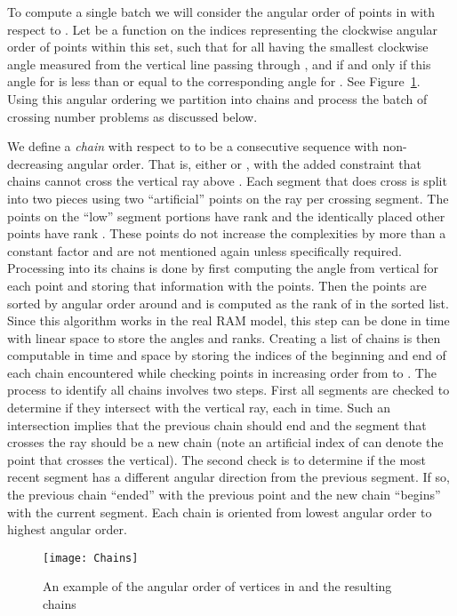 \documentclass{article}
\begin{document}
To compute a single batch we will consider the angular order of points in
 with respect to .  Let
 be a function on the indices representing the clockwise angular
order of points  within this set, such that  for 
all  having the smallest clockwise angle measured from the vertical
line passing through , and  if and only if this
angle for  is less than or equal to the corresponding angle for .
See Figure~\ref{fig:angularchains}.  Using this
angular ordering we partition  into chains and process the
batch of crossing number problems as discussed below.

We define a \emph{chain} with respect to  to be a consecutive sequence
 with non-decreasing angular order.  That
is, either  or
, with the added
constraint that chains cannot cross the vertical ray above .  Each
segment that does cross is split into two pieces using two ``artificial''
points on the ray per crossing segment.  The points on the ``low'' segment
portions have rank  and the identically placed other points have
rank .  These points do not increase the complexities by more
than a constant factor and are not mentioned again unless specifically
required.  Processing  into its chains is done by first computing
the angle from vertical for each point and storing that information with the
points.  Then the points are sorted by angular order around  and
 is computed as the rank of  in the sorted list.  Since
this algorithm works in the real RAM model, this step can be done in
 time with linear space to store the angles and ranks.  Creating
a list of chains is then computable in  time and space by storing the indices of the
beginning and end of each chain encountered while checking points  in
increasing order from  to .  The process to identify all chains involves two steps.
First all
segments are checked to determine if they intersect with the vertical ray,
each in  time.  Such an intersection implies that the previous chain
should end and the segment that crosses the ray should be a new chain (note an artificial index of  can denote the point that crosses the vertical).  The
second check is to determine if the most recent segment has a different
angular direction from the previous segment.  If so, the previous chain ``ended''
with the previous point and the new chain ``begins'' with the current segment. 
Each chain is oriented from lowest angular order to highest angular
order.

\begin{figure}
\texttt{[image: Chains]}
\caption{An example of the angular order of vertices in  and the
  resulting chains}
\label{fig:angularchains}
\end{figure}
	
\end{document}
